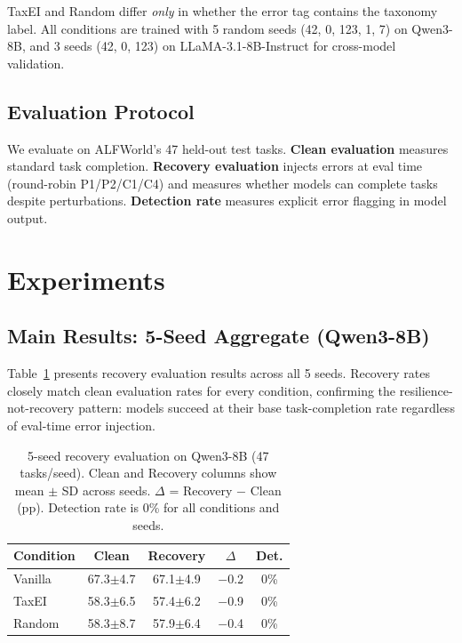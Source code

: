 \documentclass[11pt]{article}
\begin{document}
TaxEI and Random differ \emph{only} in whether the error tag contains the taxonomy label.
All conditions are trained with 5 random seeds (42, 0, 123, 1, 7) on Qwen3-8B, and 3 seeds (42, 0, 123) on LLaMA-3.1-8B-Instruct for cross-model validation.

\subsection{Evaluation Protocol}

We evaluate on ALFWorld's 47 held-out test tasks.
\textbf{Clean evaluation} measures standard task completion.
\textbf{Recovery evaluation} injects errors at eval time (round-robin P1/P2/C1/C4) and measures whether models can complete tasks despite perturbations.
\textbf{Detection rate} measures explicit error flagging in model output.

\section{Experiments}
\label{sec:experiments}

\subsection{Main Results: 5-Seed Aggregate (Qwen3-8B)}
\label{sec:main-results}

Table~\ref{tab:main-recovery} presents recovery evaluation results across all 5 seeds.
Recovery rates closely match clean evaluation rates for every condition, confirming the resilience-not-recovery pattern: models succeed at their base task-completion rate regardless of eval-time error injection.

\begin{table}[t]
\centering
\small
\begin{tabular}{lcccc}
\toprule
\textbf{Condition} & \textbf{Clean} & \textbf{Recovery} & \textbf{$\Delta$} & \textbf{Det.} \\
\midrule
Vanilla & 67.3\scriptsize{$\pm$4.7} & 67.1\scriptsize{$\pm$4.9} & $-$0.2 & 0\% \\
TaxEI   & 58.3\scriptsize{$\pm$6.5} & 57.4\scriptsize{$\pm$6.2} & $-$0.9 & 0\% \\
Random  & 58.3\scriptsize{$\pm$8.7} & 57.9\scriptsize{$\pm$6.4} & $-$0.4 & 0\% \\
\bottomrule
\end{tabular}
\caption{5-seed recovery evaluation on Qwen3-8B (47 tasks/seed). Clean and Recovery columns show mean $\pm$ SD across seeds. $\Delta$ = Recovery $-$ Clean (pp). Detection rate is 0\% for all conditions and seeds.}
\label{tab:main-recovery}
\end{table}
\end{document}
